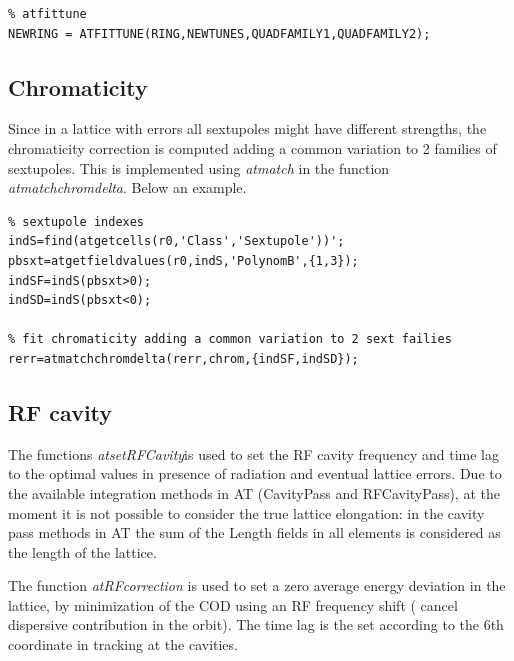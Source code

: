 \begin{lstlisting}
% atfittune
NEWRING = ATFITTUNE(RING,NEWTUNES,QUADFAMILY1,QUADFAMILY2);
\end{lstlisting}

\clearpage
\subsection{Chromaticity}
Since in a lattice with errors all sextupoles might have different strengths, the chromaticity correction is computed adding a common variation to 2 families of sextupoles. This is implemented using \emph{atmatch} in the function \emph{atmatchchromdelta}. Below an example. 

\begin{lstlisting} 
% sextupole indexes
indS=find(atgetcells(r0,'Class','Sextupole'))';
pbsxt=atgetfieldvalues(r0,indS,'PolynomB',{1,3});
indSF=indS(pbsxt>0);
indSD=indS(pbsxt<0);

% fit chromaticity adding a common variation to 2 sext failies             
rerr=atmatchchromdelta(rerr,chrom,{indSF,indSD});
\end{lstlisting}

\clearpage
\subsection{RF cavity}

The functions \emph{atsetRFCavity}is used to set the RF cavity frequency and time lag to the optimal values in presence of radiation and eventual lattice errors. Due to the available integration methods in AT (CavityPass and RFCavityPass), at the moment it is not possible to consider the true lattice elongation: in the cavity pass methods in AT the sum of the Length fields in all elements is considered as the length of the lattice. 

The function \emph{atRFcorrection} is used to set a zero average energy deviation in the lattice, by minimization of the COD using an RF frequency shift ( cancel dispersive contribution in the orbit). The time lag is the set according to the 6th coordinate in tracking at the cavities.

